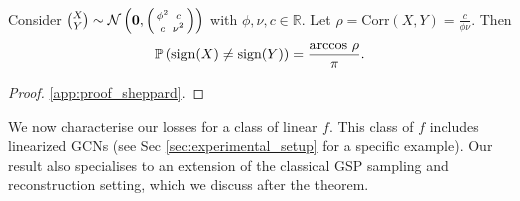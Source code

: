 \begin{lemma}
\label{lemma:gaussian_sign}
Consider  $\binom{X}{Y} \sim \mathcal{N}\left( \bm{0}, \begin{psmallmatrix} \phi^{2} & c \\ c & \nu^{2} \end{psmallmatrix} \right)$ with $\phi, \nu, c \in \mathbb{R}$. Let $\rho = \text{Corr}(X,Y) = \frac{c}{\phi\nu}$. Then
\begin{equation}
     \bs{\prob{\text{sign}(X) \neq \text{sign}(Y) }} = \frac{ \text{arccos }\rho }{\pi}.
\end{equation}
    
\end{lemma}
\begin{proof}
     \cite{sheppard1899iii}\ref{app:proof_sheppard}.
\end{proof}

We now characterise our losses for a class of linear $f$. This class of $f$ includes linearized GCNs (see Sec \ref{sec:experimental_setup} for a specific example). Our result also specialises to an extension of the classical GSP sampling and reconstruction setting, which we discuss after the theorem.
    
